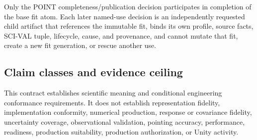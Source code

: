 Only the POINT completeness/publication decision participates in completion
of the base fit atom. Each later named-use decision is an independently
requested child artifact that references the immutable fit, binds its own
profile, source facts, SCI-VAL tuple, lifecycle, cause, and provenance, and
cannot mutate that fit, create a new fit generation, or rescue another use.

\subsection{Claim classes and evidence ceiling}\label{sec:claim-ceiling}

This contract establishes scientific meaning and conditional engineering
conformance requirements. It does not establish representation fidelity,
implementation conformity, numerical production, response or covariance
fidelity, uncertainty coverage, observational validation, pointing accuracy,
performance, readiness, production suitability, production authorization, or
Unity activity.
